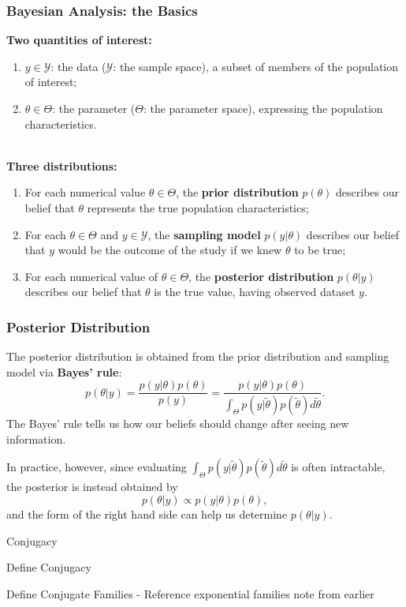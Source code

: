 \documentclass{beamer}
\begin{document}
\begin{frame}
\frametitle{Bayesian Analysis: the Basics}
\textbf{Two quantities of interest:}
\begin{enumerate}
\item $y \in \mathcal{Y}$: the data ($\mathcal{Y}$: the sample space), a subset of members of the population of interest;
\item $\theta \in \Theta$: the parameter ($\Theta$: the parameter space), expressing the population characteristics.
\end{enumerate}
~\\
\textbf{Three distributions:}
\begin{enumerate}
\item For each numerical value $\theta \in \Theta$, the \textbf{prior distribution} $p(\theta)$ describes our belief that $\theta$ represents the true population characteristics;
\item For each $\theta \in \Theta$ and $y \in \mathcal{Y}$, the \textbf{sampling model} $p(y|\theta)$ describes our belief that $y$ would be the outcome of the study if we knew $\theta$ to be true;
\item For each numerical value of $\theta \in \Theta$, the \textbf{posterior distribution} $p(\theta|y)$ describes our belief that $\theta$ is the true value, having observed dataset $y$.
\end{enumerate}
\end{frame}

\begin{frame}
\frametitle{Posterior Distribution}
The posterior distribution is obtained from the prior distribution and sampling model via \textbf{Bayes' rule}:
$$
p(\theta|y) = \frac{p(y|\theta)p(\theta)}{p(y)} = \frac{p(y|\theta)p(\theta)}{\int_{\Theta}p(y|\tilde{\theta})p(\tilde{\theta})d\tilde{\theta}}.
$$
The Bayes' rule tells us how our beliefs should change after seeing new information.

In practice, however, since evaluating $\int_{\Theta}p(y|\tilde{\theta})p(\tilde{\theta})d\tilde{\theta}$ is often intractable, the posterior is instead obtained by
$$
p(\theta|y) \propto p(y|\theta)p(\theta),
$$
and the form of the right hand side can help us determine $p(\theta|y)$.
\end{frame}


\begin{frame}{Conjugacy}

Define Conjugacy

Define Conjugate Families
- Reference exponential families note from earlier

\end{frame}
\end{document}

